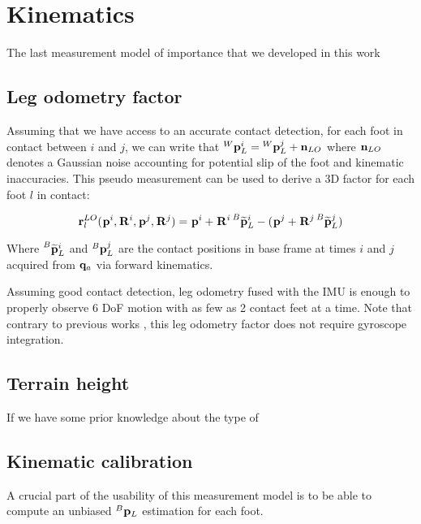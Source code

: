 \chapter{Kinematics}
\minitoc

The last measurement model of importance that we developed in this work

\section{Leg odometry factor}
Assuming that we have access to an accurate contact detection, for each foot in contact between \keyframes $i$ and $j$, we can write that 
$\prescript{W}{}{{\bf p}}_{L}^i = \prescript{W}{}{{\bf p}}_{L}^j + {\bf n}_{LO}$ where ${\bf n}_{LO}$ denotes a Gaussian noise accounting for potential slip of the foot and kinematic inaccuracies. 
This pseudo measurement can be used to derive a 3D factor for each foot $l$ in contact:

\begin{equation}
    {\bf r}^{LO}_l(\prescript{}{}{{\bf p}}_{}^i, \prescript{}{}{{\bf R}}_{}^i, \prescript{}{}{{\bf p}}_{}^j, \prescript{}{}{{\bf R}}_{}^j) = \prescript{}{}{{\bf p}}_{}^i + \prescript{}{}{{\bf R}}_{}^i \prescript{B}{}{\widetilde{{\bf p}}}_{L}^i - (\prescript{}{}{{\bf p}}_{}^j + \prescript{}{}{{\bf R}}_{}^j \prescript{B}{}{\widetilde{{\bf p}}}_{L}^j)
\end{equation}

Where $\prescript{B}{}{\widetilde{{\bf p}}}_{L}^i$ and $\prescript{B}{}{{\bf p}}_{L}^j$ are the contact positions in base frame at times $i$ and $j$ acquired from ${\bf q}_a$ via forward kinematics. 

Assuming good contact detection, leg odometry fused with the IMU is enough to properly observe 6 DoF motion with as few as 2 contact feet at a time. 
Note that contrary to previous works \cite{hartley2018legged, wisth2020preintegrated}, this leg odometry factor does not require gyroscope integration.

\section{Terrain height}

If we have some prior knowledge about the type of 

\section{Kinematic calibration}
A crucial part of the usability of this measurement model is to be able to compute an unbiased $\prescript{B}{}{{\bf p}}_{L}$ estimation for each foot.
